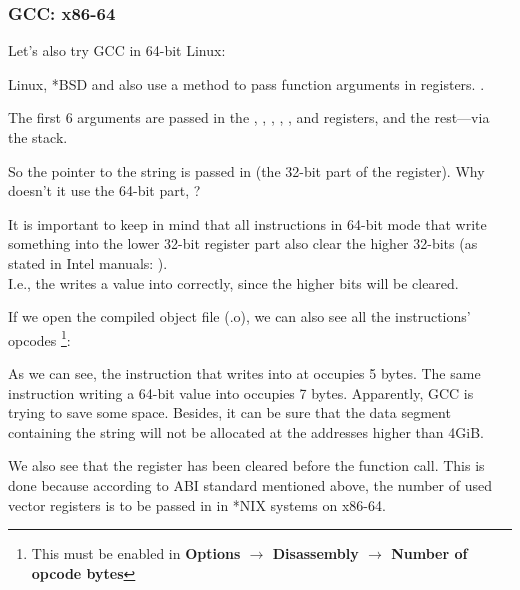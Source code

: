 \subsubsection{GCC: x86-64}

Let's also try GCC in 64-bit Linux:



Linux, *BSD and \MacOSX also use a method to pass function arguments in registers. \SysVABI{}.

The first 6 arguments are passed in the \RDI, \RSI, \RDX, \RCX, , and   registers, and the rest---via the stack.

So the pointer to the string is passed in \EDI (the 32-bit part of the register).
Why doesn't it use the 64-bit part, \RDI?

It is important to keep in mind that all \MOV instructions in 64-bit mode that write something into the lower 32-bit register part also clear the higher 32-bits (as stated in Intel manuals: ).\\
I.e., the  writes a value into \RAX correctly, since the higher bits will be cleared.

If we open the compiled object file (.o), we can also see all the instructions' opcodes
\footnote{This must be enabled in \textbf{Options $\rightarrow$ Disassembly $\rightarrow$ Number of opcode bytes}}:



\label{hw_EDI_instead_of_RDI}
As we can see, the instruction that writes into \EDI at  occupies 5 bytes.
The same instruction writing a 64-bit value into \RDI occupies 7 bytes.
Apparently, GCC is trying to save some space.
Besides, it can be sure that the data segment containing the string will not be allocated at the addresses higher than 4\gls{GiB}.

\label{SysVABI_input_EAX}
We also see that the \EAX register has been cleared before the \printf function call.
This is done because according to \ac{ABI} standard mentioned above,
the number of used vector registers is to be passed in \EAX in *NIX systems on x86-64.
